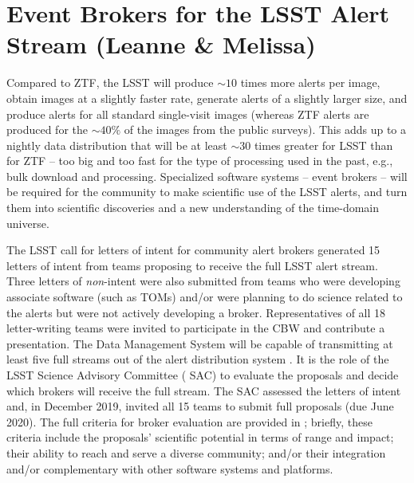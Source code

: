 \section{Event Brokers for the  LSST Alert Stream (Leanne \& Melissa)} \label{sec:lsstbrokers}


Compared to  {ZTF}, the  {LSST} will produce $\sim10$ times more alerts per image, obtain images at a slightly faster rate, generate alerts of a slightly larger size, and produce alerts for all standard single-visit images (whereas  {ZTF} alerts are produced for the $\sim40\%$ of the images from the public surveys).
This adds up to a nightly data distribution that will be at least $\sim30$ times greater for  {LSST} than for  {ZTF} -- too big and too fast for the type of processing used in the past, e.g., bulk download and processing.
Specialized software systems -- event brokers -- will be required for the community to make scientific use of the  {LSST} alerts, and turn them into scientific discoveries and a new understanding of the time-domain universe.

The  {LSST} call for letters of intent for community alert brokers \citep{LDM-682} generated 15 letters of intent from teams proposing to receive the full  {LSST} alert stream.
Three letters of {\it non}-intent were also submitted from teams who were developing associate software (such as TOMs) and/or were planning to do science related to the alerts but were not actively developing a broker.
Representatives of all 18 letter-writing teams were invited to participate in the  {CBW} and contribute a presentation.
The  {Data Management System} will be capable of transmitting at least five full streams out of the alert distribution system \citep{LSE-61}.
It is the role of the  {LSST}  {Science Advisory Committee} ( {SAC}) to evaluate the proposals and decide which brokers will receive the full stream.
The  {SAC} assessed the letters of intent and, in December 2019, invited all 15 teams to submit full proposals (due June 2020).
The full criteria for broker evaluation are provided in \citet{LDM-612}; briefly, these criteria include the proposals' scientific potential in terms of range and impact; their ability to reach and serve a diverse community; and/or their integration and/or complementary with other software systems and platforms. 

